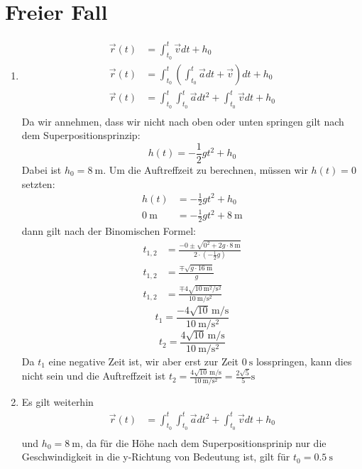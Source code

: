 \documentclass[sectionformat = aufgabe]{gadsescript}
\begin{document}
\section{Freier Fall}
\begin{enumerate}[label=\alph*)]
	\item 
		\begin{align*}
			\vec r(t) &= \int_{t_0}^{t} \vec v dt + h_0\\
			\vec r(t) &= \int_{t_0}^{t} \left(\int_{t_0}^{t} \vec a dt + \vec v \right) dt + h_0\\
			\vec r(t) &= \int_{t_0}^{t} \int_{t_0}^{t} \vec a dt^2 + \int_{t_0}^{t} \vec v dt + h_0\\
		\end{align*}
		Da wir annehmen, dass wir nicht nach oben oder unten springen gilt nach dem Superpositionsprinzip:
			\[h(t) = -\frac{1}{2}gt^2 + h_0\]
		Dabei ist $h_0 = \qty{8}{\metre}$. Um die Auftreffzeit zu berechnen, müssen wir $ h(t) = 0 $ setzten:
		\begin{align*}
			h(t) &= -\frac{1}{2}gt^2 + h_0\\
			\qty{0}{\metre} &= -\frac{1}{2}gt^2 + \qty{8}{\metre}
		\end{align*}
		dann gilt nach der Binomischen Formel:
		\begin{align*}
			t_{1,2} &= \frac{-0 \pm \sqrt{0^2 + 2g\cdot \qty{8}{\metre}}}{2\cdot \left(-\frac{1}{2}g\right)}\\
			t_{1,2} &= \frac{\mp \sqrt{g \cdot \qty{16}{\metre}}}{g}\\
			t_{1,2} &= \frac{\mp 4\sqrt{\qty{10}{\square\metre\per\square\second}}}{\qty{10}{\metre\per\square\second}}
		\end{align*}
		\[ t_1 = \frac{- 4\sqrt{10}\,\unit{\metre\per\second}}{\qty{10}{\metre\per\square\second}} \]
		\[ t_2 = \frac{4\sqrt{10}\,\unit{\metre\per\second}}{\qty{10}{\metre\per\square\second}} \]
		Da $ t_1 $ eine negative Zeit ist, wir aber erst zur Zeit $ \qty{0}{\second} $ losspringen, kann dies nicht sein und die Auftreffzeit ist $ t_2 = \frac{4\sqrt{10}\,\unit{\metre\per\second}}{\qty{10}{\metre\per\square\second}} = \frac{2\sqrt{5}}{5}\unit{\second}$
	\item Es gilt weiterhin
		\begin{align*}
			\vec r(t) &= \int_{t_0}^{t} \int_{t_0}^{t} \vec a dt^2 + \int_{t_0}^{t} \vec v dt + h_0\\
		\end{align*}
		und $ h_0 = \qty{8}{\metre} $, da für die Höhe nach dem Superpositionsprinip nur die Geschwindigkeit in die y-Richtung von Bedeutung ist, gilt für $ t_0 = \qty{0.5}{\second} $

\end{enumerate}
\end{document}
